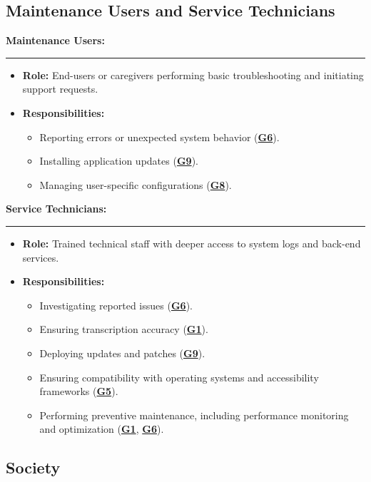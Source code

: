 \documentclass[11pt]{article}
\begin{document}
\subsection{Maintenance Users and Service Technicians}
\textbf{Maintenance Users:}\\
\hrule
\begin{itemize}
    \item \textbf{Role:} End-users or caregivers performing basic troubleshooting and initiating support requests.
    \item \textbf{Responsibilities:} 
        \begin{itemize}
            \item Reporting errors or unexpected system behavior (\textbf{\hyperref[tab:project-goals]{G6}}).
            \item Installing application updates (\textbf{\hyperref[tab:project-goals]{G9}}).
            \item Managing user-specific configurations (\textbf{\hyperref[tab:project-goals]{G8}}).
        \end{itemize}
\end{itemize}
\vspace{1em}
\textbf{Service Technicians:}\\
\hrule
\begin{itemize}
    \item \textbf{Role:} Trained technical staff with deeper access to system logs and back-end services.
    \item \textbf{Responsibilities:}
        \begin{itemize}
            \item Investigating reported issues (\textbf{\hyperref[tab:project-goals]{G6}}).
            \item Ensuring transcription accuracy (\textbf{\hyperref[tab:project-goals]{G1}}).
            \item Deploying updates and patches (\textbf{\hyperref[tab:project-goals]{G9}}).
            \item Ensuring compatibility with operating systems and accessibility frameworks (\textbf{\hyperref[tab:project-goals]{G5}}).
            \item Performing preventive maintenance, including performance monitoring and optimization (\textbf{\hyperref[tab:project-goals]{G1}}, \textbf{\hyperref[tab:project-goals]{G6}}).
        \end{itemize}
\end{itemize}
\subsection{Society}
\end{document}
